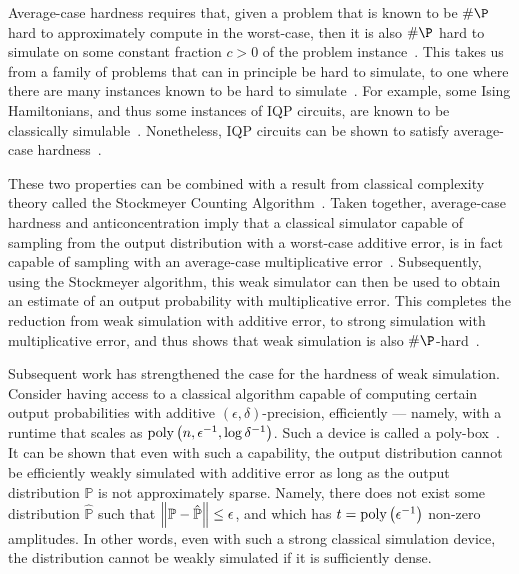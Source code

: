 Average-case hardness requires that, given a problem that is known to be $\#\P$ hard to approximately compute in the worst-case, then it is also $\#\P$ hard to simulate on some constant fraction $c>0$ of the problem instance~\cite{Bremner2016}. This takes us from a family of problems that can in principle be hard to simulate, to one where there are many instances known to be hard to simulate~\cite{Harrow2017}. For example, some Ising Hamiltonians, and thus some instances of IQP circuits, are known to be classically simulable~\cite{Fujii2017}. Nonetheless, IQP circuits can be shown to satisfy average-case hardness~\cite{Bremner2016}.\par
These two properties can be combined with a result from classical complexity theory called the Stockmeyer Counting Algorithm~\cite{Stockmeyer1985}. Taken together, average-case hardness and anticoncentration imply that a classical simulator capable of sampling from the output distribution with a worst-case additive error, is in fact capable of sampling with an average-case multiplicative error~\cite{Bremner2016}. Subsequently, using the Stockmeyer algorithm, this weak simulator can then be used to obtain an estimate of an output probability with multiplicative error. This completes the reduction from weak simulation with additive error, to strong simulation with multiplicative error, and thus shows that weak simulation is also $\#\P$-hard~\cite{Bremner2016}.\par
Subsequent work has strengthened the case for the hardness of weak simulation. Consider having access to a classical algorithm capable of computing certain output probabilities with additive $\left(\epsilon,\delta\right)$-precision, efficiently --- namely, with a runtime that scales as $\text{poly}\left(n,\epsilon^{-1},\log\delta^{-1}\right)$. Such a device is called a poly-box~\cite{Pashayan2017}. It can be shown that even with such a capability, the output distribution cannot be efficiently weakly simulated with additive error as long as the output distribution $\mathbb{P}$ is not approximately sparse. Namely, there does not exist some distribution $\hat{\mathbb{P}}$ such that $\norm{\mathbb{P}-\mathbb{\hat{P}}}\leq \epsilon$, and which has $t=\text{poly}\left(\epsilon^{-1}\right)$ non-zero amplitudes. In other words, even with such a strong classical simulation device, the distribution cannot be weakly simulated if it is sufficiently dense.
